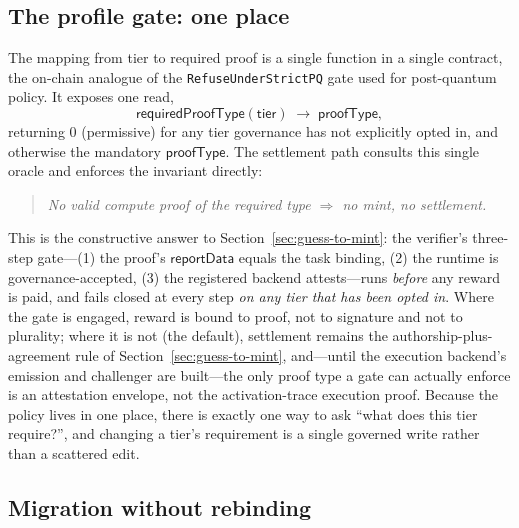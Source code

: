 \subsection{The profile gate: one place}
\label{sec:profile-gate}

The mapping from tier to required proof is a single function in a single contract,
the on-chain analogue of the \texttt{RefuseUnderStrictPQ} gate used for post-quantum
policy. It exposes one read,
\begin{equation}
\mathsf{requiredProofType}(\mathsf{tier}) \;\to\; \mathsf{proofType},
\end{equation}
returning $0$ (permissive) for any tier governance has not explicitly opted in, and
otherwise the mandatory $\mathsf{proofType}$. The settlement path consults this single
oracle and enforces the invariant directly:

\begin{quote}\itshape
No valid compute proof of the required type $\Rightarrow$ no mint, no settlement.
\end{quote}

This is the constructive answer to Section~\ref{sec:guess-to-mint}: the verifier's
three-step gate---(1) the proof's $\mathsf{reportData}$ equals the task binding,
(2) the runtime is governance-accepted, (3) the registered backend attests---runs
\emph{before} any reward is paid, and fails closed at every step \emph{on any tier that
has been opted in}. Where the gate is engaged, reward is bound to
proof, not to signature and not to plurality; where it is not (the default), settlement
remains the authorship-plus-agreement rule of Section~\ref{sec:guess-to-mint}, and---until
the execution backend's emission and challenger are built---the only proof type a gate can
actually enforce is an attestation envelope, not the activation-trace execution proof.
Because the policy lives in one place,
there is exactly one way to ask ``what does this tier require?'', and changing a
tier's requirement is a single governed write rather than a scattered edit.

\subsection{Migration without rebinding}

